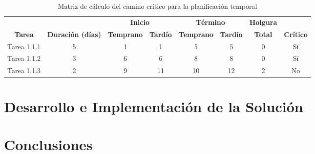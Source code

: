 \documentclass[12pt]{report}
\begin{document}
\begin{table}[hbt]
	\centering
	\small
	\begin{tabular}{|c|c|cc|cc|c|c|}\hline
		& & \multicolumn{2}{|c|}{\textbf{Inicio}} & \multicolumn{2}{|c|}{\textbf{Término}} & \textbf{Holgura} & \\
		\textbf{Tarea}& \textbf{Duración (días)}& \textbf{Temprano} &\textbf{Tardío} &\textbf{Temprano} &\textbf{Tardío} &\textbf{Total}  &\textbf{Crítico} \\\hline
		Tarea 1.1.1 & 5 & 1 & 1 & 5 & 5 & 0 & Sí \\\hline
		Tarea 1.1.2 & 3 & 6 & 6 & 8 & 8 & 0 & Sí \\\hline
		Tarea 1.1.3 & 2 & 9 & 11 & 10 & 12 & 2 & No \\\hline
	\end{tabular}
	\caption{Matriz de cálculo del camino crítico para la planificación temporal}
	\label{tab:caminocritico}
\end{table}






\chapter{Desarrollo e Implementación de la Solución}\label{desarrollo}

\chapter{Conclusiones}\label{conclusion}






\end{document}
